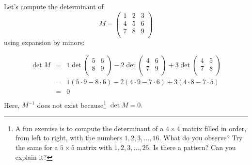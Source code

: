 \begin{example}
Let's compute the determinant of 
\[M=\begin{pmatrix}
1 & 2 & 3 \\
4 & 5 & 6 \\
7 & 8 & 9 \\
\end{pmatrix}\] using expansion by minors:

\begin{eqnarray*}
\det M & = & 1\det \begin{pmatrix}
5 & 6 \\
8 & 9 \\
\end{pmatrix}
-2 \det \begin{pmatrix}
4 & 6 \\
7 & 9 \\
\end{pmatrix}
+3 \det \begin{pmatrix}
4 & 5 \\
7 & 8 \\
\end{pmatrix} \\
& = & 1(5\cdot 9- 8\cdot 6) -2 (4\cdot 9- 7\cdot 6) + 3 (4\cdot 8- 7\cdot 5) \\[1mm]
& = & 0 \\
\end{eqnarray*}
Here, $M^{-1}$ does not exist because\footnote{A fun exercise is to compute the determinant of a $4\times 4$ matrix filled in order, from left to right,  with the numbers $1,2,3,\ldots, 16$. What do you observe? Try the same for a $5\times 5$ matrix with $1,2,3,\ldots, 25$. Is there a pattern? Can you explain it?} $\det M=0.$
\end{example}


